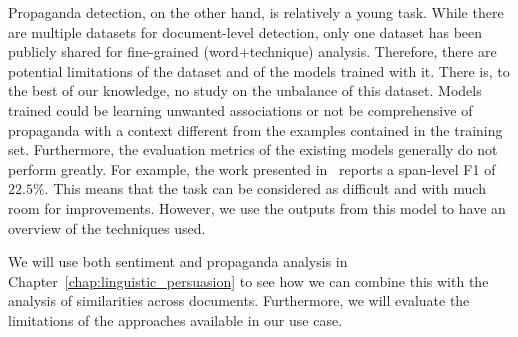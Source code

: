 Propaganda detection, on the other hand, is relatively a young task.
While there are multiple datasets for document-level detection, only one dataset has been publicly shared for fine-grained (word+technique) analysis.
Therefore, there are potential limitations of the dataset and of the models trained with it.
There is, to the best of our knowledge, no study on the unbalance of this dataset. Models trained could be learning unwanted associations or not be comprehensive of propaganda with a context different from the examples contained in the training set.
Furthermore, the evaluation metrics of the existing models generally do not perform greatly.
For example, the work presented in~\citep{da2019fine} reports a span-level F1 of $22.5\%$.
This means that the task can be considered as difficult and with much room for improvements.
However, we use the outputs from this model to have an overview of the techniques used.


We will use both sentiment and propaganda analysis in Chapter~\ref{chap:linguistic_persuasion} to see how we can combine this with the analysis of similarities across documents.
Furthermore, we will evaluate the limitations of the approaches available in our use case.

